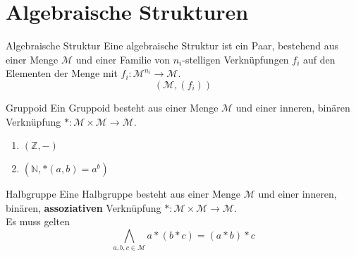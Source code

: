 \documentclass[]{beamer}
\begin{document}
\section{Algebraische Strukturen}
\begin{frame}[squeeze]{}
  \vspace*{-0.25em}
  \begin{block}{Algebraische Struktur}
    Eine algebraische Struktur ist ein Paar, bestehend aus einer Menge $\mathcal{M}$ und einer Familie von $n_i$-stelligen Verknüpfungen $f_i$ auf den Elementen der Menge mit $f_i \colon \mathcal{M}^{n_i} \to \mathcal{M}$.
    \[\left(\mathcal{M}, \left( f_i \right) \right)\]
  \end{block}
  \vspace*{-0.5em}
  
  \pause  
  
  \begin{block}{Gruppoid}
    Ein Gruppoid besteht aus einer Menge $\mathcal{M}$ und einer inneren, binären Verknüpfung $\ast \colon \mathcal{M} \times \mathcal{M} \to \mathcal{M}$.
    \begin{enumerate}
      \item $\left( \mathbb{Z}, - \right)$
      \item $\left( \mathbb{N}, \ast \left(a, b \right) = a^b \right)$
    \end{enumerate}
  \end{block}
  \vspace*{-0.5em}
  
  \pause  
  
  \begin{block}{Halbgruppe}
    Eine Halbgruppe besteht aus einer Menge $\mathcal{M}$ und einer inneren, binären, \textbf{assoziativen} Verknüpfung $\ast \colon \mathcal{M} \times \mathcal{M} \to \mathcal{M}$. \\
    Es muss gelten \[\bigwedge_{a, b, c \in \mathcal{M}} a \ast \left( b \ast c \right) = \left( a \ast b \right) \ast c\]
  \end{block}
\end{frame}
\end{document}
